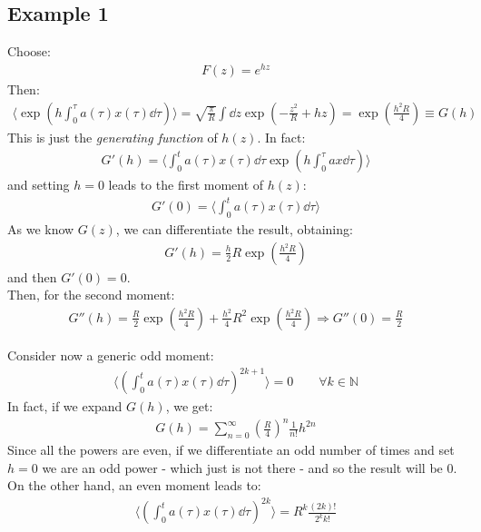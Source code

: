 \documentclass[../template.tex]{subfiles}
\begin{document}
\subsection{Example 1}
Choose:
\begin{align*}
    F(z) = e^{hz}
\end{align*} 
Then:
\begin{align*}
    \langle \exp\left(h \int_0^\tau a(\tau) x(\tau) \dd{\tau}\right) \rangle = \sqrt{\frac{\pi}{R} } \int \dd{z} \exp\left(-\frac{z^2}{R} + hz \right) = \exp\left(\frac{h^2 R}{4} \right) \equiv G(h)
\end{align*}
This is just the \textit{generating function} of $h(z)$. In fact: 
\begin{align*}
    G'(h) = \langle \int_0^t a(\tau) x(\tau) \dd{\tau} \exp\left(h \int_0^\tau a x \dd{\tau}\right) \rangle
\end{align*}
and setting $h = 0$ leads to the first moment of $h(z)$:
\begin{align*}
    G'(0) = \langle \int_0^t a(\tau) x(\tau) \dd{\tau} \rangle
\end{align*}  
As we know $G(z)$, we can differentiate the result, obtaining:
\begin{align*}
    G'(h) = \frac{h}{2} R \exp\left(\frac{h^2 R}{4} \right) 
\end{align*} 
and then $G'(0) = 0$.\\
Then, for the second moment:
\begin{align*}
    G''(h) = \frac{R}{2} \exp\left(\frac{h^2 R}{4} \right) + \frac{h^2}{4} R^2 \exp\left(\frac{h^2 R}{4} \right) \Rightarrow G''(0) = \frac{R}{2}  
\end{align*} 

Consider now a generic odd moment:
\begin{align*}
    \langle \left(\int_0^t a(\tau)x(\tau) \dd{\tau}\right)^{2k+1} \rangle = 0 \qquad \forall k \in \mathbb{N}
\end{align*}
In fact, if we expand $G(h)$, we get:
\begin{align*}
    G(h) = \sum_{n=0}^\infty
 \left(\frac{R}{4} \right)^n \frac{1}{n!} h^{2n} \end{align*}
Since all the powers are even, if we differentiate an odd number of times and set $h=0$ we are  an odd power - which just is not there - and so the result will be $0$.\\
On the other hand, an even moment leads to:
\begin{align*}
    \langle \left(\int_0^t a(\tau) x(\tau) \dd{\tau}\right)^{2k} \rangle = R^{k} \frac{(2k)!}{2^{k} k!} 
\end{align*}
\end{document}
